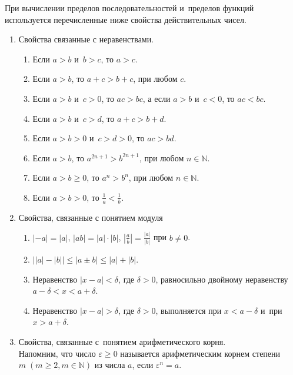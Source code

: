 
При вычислении пределов последовательностей и~пределов функций используется
перечисленные ниже свойства действительных чисел.

\begin{enumerate}

\item\label{lst:3_1_2_1} Свойства связанные с неравенствами.

\begin{enumerate}
\item Если $a > b$ и~$b > c$, то $a > c$.
\item Если $a > b$, то $a + c > b + c$, при любом  $c$.
\item Если $a > b$ и~$c > 0$, то $ac > bc$, а если $a > b$ и~$c < 0$, то $ac < bc$.
\item Если $a > b$ и~$c > d$, то $a + c > b + d$.
\item Если $a > b > 0$ и~$c > d > 0$, то $ac > bd$.
\item Если $a > b$, то $a^{2n+1} > b^{2n+1}$, при любом  $n \in \mathbb{N}$.
\item Если $a > b \geqslant 0$, то $a^{n} > b^{n}$, при любом  $n \in \mathbb{N}$.
\item Если $a > b > 0$, то $\displaystyle \frac{1}{a} < \frac{1}{b}$.
\end{enumerate}

\item\label{lst:3_1_2_2} Свойства, связанные с понятием модуля
\begin{enumerate}
\item $|-a| = |a|$, $|ab| = |a| \cdot |b|$,
$\displaystyle \left| \frac{a}{b} \right| = \frac{|a|}{|b|}$ при $b \ne 0$.
\item $\left||a| - |b|\right| \leqslant |a \pm b| \leqslant |a| + |b|$.
\item Неравенство $|x - a| < \delta$, где $\delta > 0$, равносильно
двойному неравенству $a - \delta < x < a + \delta$.
\item Неравенство $|x - a| > \delta$, где $\delta > 0$, выполняется при $x < a - \delta$
и~при $x > a + \delta$.
\end{enumerate}

\item\label{lst:3_1_2_3} Свойства, связанные с~понятием арифметического корня.\\
Напомним, что число $\varepsilon \geqslant 0$ называется арифметическим корнем степени
$m \; (m \geqslant 2, m \in \mathbb{N})$ из числа $a$, если $\varepsilon^{n} = a$.


\end{enumerate}
